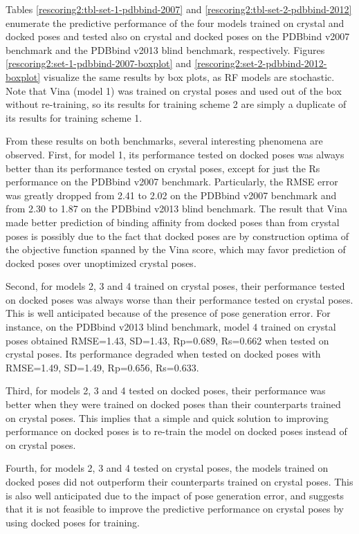 \documentclass[twocolumn]{bmcart}
\begin{document}
Tables \ref{rescoring2:tbl-set-1-pdbbind-2007} and \ref{rescoring2:tbl-set-2-pdbbind-2012} enumerate the predictive performance of the four models trained on crystal and docked poses and tested also on crystal and docked poses on the PDBbind v2007 benchmark and the PDBbind v2013 blind benchmark, respectively. Figures \ref{rescoring2:set-1-pdbbind-2007-boxplot} and \ref{rescoring2:set-2-pdbbind-2012-boxplot} visualize the same results by box plots, as RF models are stochastic. Note that Vina (model 1) was trained on crystal poses and used out of the box without re-training, so its results for training scheme 2 are simply a duplicate of its results for training scheme 1.

From these results on both benchmarks, several interesting phenomena are observed. First, for model 1, its performance tested on docked poses was always better than its performance tested on crystal poses, except for just the Rs performance on the PDBbind v2007 benchmark. Particularly, the RMSE error was greatly dropped from 2.41 to 2.02 on the PDBbind v2007 benchmark and from 2.30 to 1.87 on the PDBbind v2013 blind benchmark. The result that Vina made better prediction of binding affinity from docked poses than from crystal poses is possibly due to the fact that docked poses are by construction optima of the objective function spanned by the Vina score, which may favor prediction of docked poses over unoptimized crystal poses.

Second, for models 2, 3 and 4 trained on crystal poses, their performance tested on docked poses was always worse than their performance tested on crystal poses. This is well anticipated because of the presence of pose generation error. For instance, on the PDBbind v2013 blind benchmark, model 4 trained on crystal poses obtained RMSE=1.43, SD=1.43, Rp=0.689, Rs=0.662 when tested on crystal poses. Its performance degraded when tested on docked poses with RMSE=1.49, SD=1.49, Rp=0.656, Rs=0.633.

Third, for models 2, 3 and 4 tested on docked poses, their performance was better when they were trained on docked poses than their counterparts trained on crystal poses. This implies that a simple and quick solution to improving performance on docked poses is to re-train the model on docked poses instead of on crystal poses.

Fourth, for models 2, 3 and 4 tested on crystal poses, the models trained on docked poses did not outperform their counterparts trained on crystal poses. This is also well anticipated due to the impact of pose generation error, and suggests that it is not feasible to improve the predictive performance on crystal poses by using docked poses for training.
\end{document}
